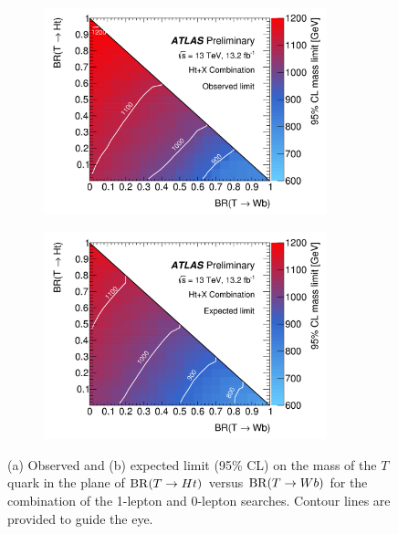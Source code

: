 \begin{figure}[h!]
\begin{subfigure}{0.5\textwidth}
  \centering
  \includegraphics[width=0.9\textwidth]{figures/VLQ/fig_19a.png}
  \caption{}
  \label{}
\end{subfigure}
\begin{subfigure}{0.5\textwidth}
  \centering
  \includegraphics[width=0.9\textwidth]{figures/VLQ/fig_19b.png}
  \caption{}
  \label{}
\end{subfigure}
\captionsetup{width=0.85\textwidth} \caption{\small (a) Observed and (b) expected limit (95\% CL) on the mass of the $T$ quark in the plane 
of ${\rm BR}(T \to Ht)$ versus ${\rm BR}(T \to Wb)$ for the combination of the 1-lepton and 0-lepton searches. 
Contour lines are provided to guide the eye.}
\label{sec:vlq:fig:tempplot}
\end{figure}

